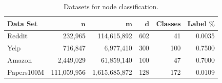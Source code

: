                 


\begin{table}[t]
	\vspace{-3mm}
	\centering
	\tblcapup
	\caption{Datasets for node classification.}
	\vspace{-5mm}
	\tblcapdown
	\begin{small}
		\begin{tabular}{|l|r|r|r|r|r|} %
			\hline
			{\bf Data Set} & {\bf $\boldsymbol{n}$}& {\bf $\boldsymbol{m}$} & {\bf $\boldsymbol{d}$}& {\bf Classes} 	& {\bf Label $\%$}  \\ \hline
    Reddit     & 232,965 &   114,615,892 &602 & 41  & 0.0035           \\
    Yelp        & 716,847     & 6,977,410   & 300 & 100 & 0.7500         \\
    Amazon        & 2,449,029   & 61,859,140  & 100   & 47 & 0.7000      \\
    Papers100M     & 111,059,956 & 1,615,685,872  & 128  &  172 & 0.0109           \\
			\hline
		\end{tabular}
	\end{small}
	\label{tbl:datasets_gnn}
	\vspace{-6mm}
\end{table}

